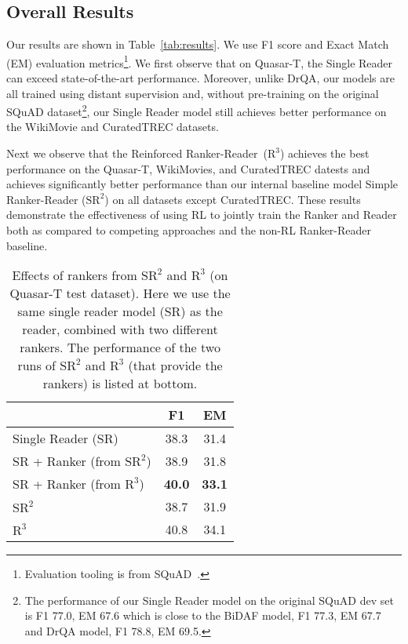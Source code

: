 \documentclass[letterpaper]{article} %
\begin{document}
\subsection{Overall Results}
Our results are shown in Table~\ref{tab:results}. We use F1 score and Exact Match (EM) evaluation metrics\footnote{Evaluation tooling is from SQuAD~\cite{rajpurkar2016squad}.}.  We first observe that on Quasar-T, the Single Reader can exceed state-of-the-art performance. Moreover, unlike DrQA, our models are all trained using distant supervision and, without pre-training on the original SQuAD dataset\footnote{The performance of our Single Reader model on the original SQuAD dev set is F1 77.0, EM 67.6 which is close to the BiDAF model, F1 77.3, EM 67.7 and DrQA model, F1 78.8, EM 69.5.}, our Single Reader model still achieves better performance on the WikiMovie and CuratedTREC datasets. 

Next we observe that the Reinforced Ranker-Reader~($\text{R}^3$) achieves the best performance on the Quasar-T, WikiMovies, and CuratedTREC datests and achieves significantly better performance than our internal baseline model Simple Ranker-Reader ($\text{SR}^2$) on all datasets except CuratedTREC.
These results demonstrate the effectiveness of using RL to jointly train the Ranker and Reader both as compared to competing approaches and the non-RL Ranker-Reader baseline. 


\begin{table}[t]
\centering
\begin{tabular}{lcc}
\toprule
                  & F1            & EM \\
                  \midrule
Single Reader (SR) & 38.3 & 31.4 \\
SR + Ranker (from $\text{SR}^2$)  & 38.9 & 31.8 \\
SR + Ranker (from $\text{R}^3$)  & \textbf{40.0} & \textbf{33.1}  \\ 
\midrule
$\text{SR}^2$  & 38.7 & 31.9 \\
$\text{R}^3$  & {40.8} & {34.1}  \\ 
\bottomrule
                  \end{tabular}
\caption{Effects of rankers from $\text{SR}^2$ and $\text{R}^3$ (on Quasar-T test dataset). Here we use the same single reader model (SR) as the reader, combined with two different rankers.
The performance of the two runs of $\text{SR}^2$ and $\text{R}^3$ (that provide the rankers) is listed at bottom.
}
\label{tab:analysis1}
\end{table}
\end{document}
